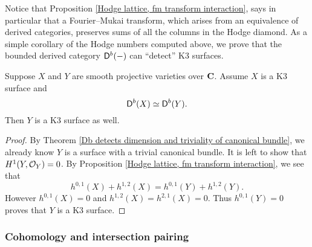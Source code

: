 Notice that Proposition \ref{Hodge lattice, fm transform interaction}, says in particular that a Fourier--Mukai transform, which arises from an equivalence of derived categories, preserves sums of all the columns in the Hodge diamond. As a simple corollary of the Hodge numbers computed above, we prove that the bounded derived category $\mathsf{D}^b(-)$ can ``detect'' K3 surfaces.

\begin{theorem}
    \label{Db(-) detects K3}
    \emph{\cite[\S 16, Proposition 2.1]{Huybrechts2016}}
    Suppose $X$ and $Y$ are smooth projective varieties over $\mathbf C$. Assume $X$ is a K3 surface and
    \[
        \mathsf{D}^b(X) \simeq \mathsf{D}^b(Y).
    \]
    Then $Y$ is a K3 surface as well. 
\end{theorem}

\begin{proof}
    By Theorem \ref{Db detects dimension and triviality of canonical bundle}, we already know $Y$ is a surface with a trivial canonical bundle. It is left to show that $H^{1}(Y, {\mathcal{O}_{Y}}) = 0$. By Proposition \ref{Hodge lattice, fm transform interaction}, we see that 
    \[
        h^{0,1}(X) + h^{1,2}(X) = h^{0,1}(Y) + h^{1,2}(Y). 
    \]
    However $h^{0,1}(X) = 0$ and $h^{1,2}(X) = h^{2,1}(X) = 0$.
    Thus $h^{0,1}(Y) = 0$ proves that $Y$ is a K3 surface.
\end{proof}

\subsubsection*{Cohomology and intersection pairing}

